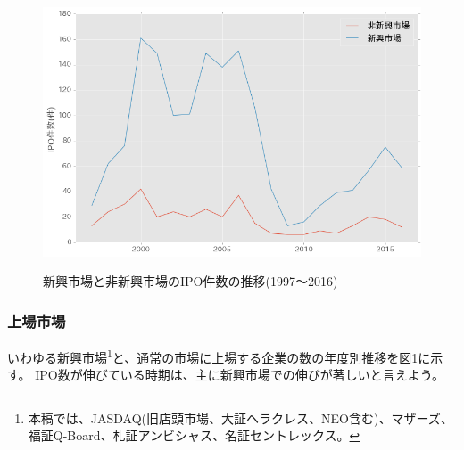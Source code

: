\documentclass{jsarticle}
\begin{document}
\begin{figure}[!h]
  \begin{center}
  \caption{新興市場と非新興市場のIPO件数の推移(1997〜2016)}
    \includegraphics[clip,width=14cm]{./rising.png}
    \label{rising}
  \end{center}
\end{figure}

\newpage

\subsubsection{上場市場}

いわゆる新興市場\footnote[10]{本稿では、JASDAQ(旧店頭市場、大証ヘラクレス、NEO含む)、マザーズ、福証Q-Board、札証アンビシャス、名証セントレックス。}と、通常の市場に上場する企業の数の年度別推移を図\ref{rising}に示す。 IPO数が伸びている時期は、主に新興市場での伸びが著しいと言えよう。
\end{document}
